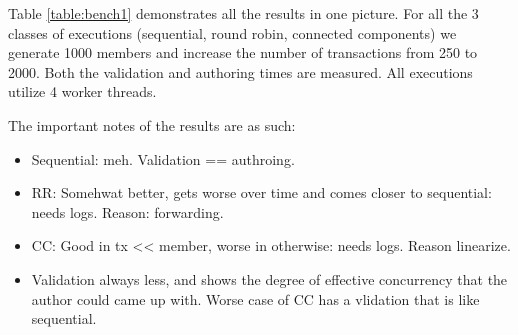 Table \ref{table:bench1} demonstrates all the results in one picture. For all the 3 classes of
executions (sequential, round robin, connected components) we generate 1000 members and increase
the number of transactions from 250 to 2000. Both the validation and authoring times are measured.
All executions utilize 4 worker threads.

The important notes of the results are as such:

\begin{itemize}
	\item Sequential: meh. Validation  == authroing.
	\item RR: Somehwat better, gets worse over time and comes closer to sequential: needs logs.
	Reason: forwarding.
	\item CC: Good in tx << member, worse in otherwise: needs logs. Reason linearize.
	\item Validation always less, and shows the degree of effective concurrency that the author
	could came up with. Worse case of CC has a vlidation that is like sequential.
\end{itemize}
